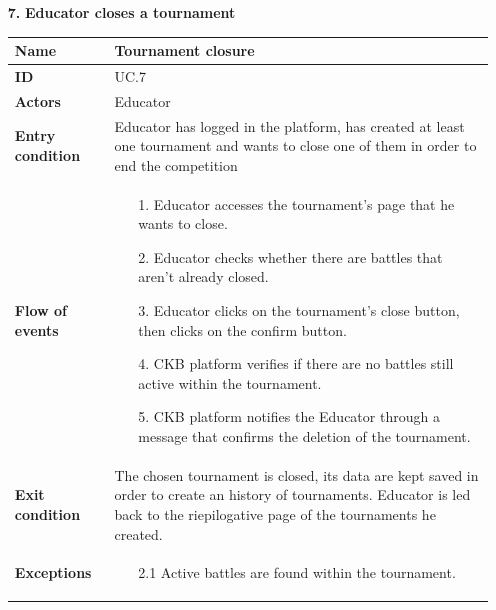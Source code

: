 \documentclass{article}
\begin{document}
{\begin{enumerate}
    \newpage
    \item[\textbf{7.}] \textbf{Educator closes a tournament}
          \begin{xltabular}{\textwidth}
              {| >{\raggedright\arraybackslash}g | >{\raggedright\arraybackslash}X |}
              \hline
              \endfirsthead
              \hline
              \endhead
              \endfoot
              \hline
              \endlastfoot




              \textbf{Name} & Tournament closure\\
              \hline
              \textbf{ID} & UC.7\\
              \hline
              \textbf{Actors} & Educator\\
              \hline
              \textbf{Entry condition} & Educator has logged in the platform, has created at least one tournament
              and wants to close one of them in order to end the competition \\
              \hline
              \textbf{Flow of events} &    \begin{enumerate}
                  \item[1.] Educator accesses the tournament's page
                        that he wants to close.
                  \item[2.] Educator checks whether there are battles that
                        aren't already closed.
                  \item[3.] Educator clicks on the tournament's close button,
                        then clicks on the confirm button.
                  \item[4.] CKB platform verifies if there are no battles
                        still active within the tournament.
                  \item[5.] CKB platform notifies the Educator through
                        a message that confirms the deletion of the tournament.
              \end{enumerate} \\
              \hline
              \textbf{Exit condition} & The chosen tournament is closed, its data are kept saved in
              order to create an history of tournaments. Educator is led back to the riepilogative
              page of the tournaments he created. \\
              \hline
              \textbf{Exceptions} &    \begin{itemize}
                  \item[2.1] Active battles are found within the tournament.

\end{itemize}
\end{xltabular}
\end{enumerate}}
\end{document}

